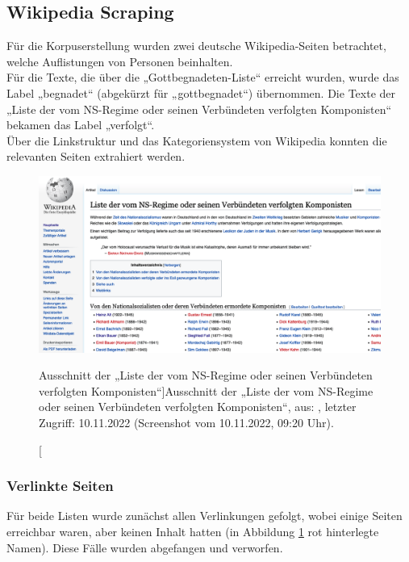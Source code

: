 \documentclass[ngerman]{ttlab-qualify}
\begin{document}
\subsection{Wikipedia Scraping} \label{Wiki_scraping}
Für die Korpuserstellung wurden zwei deutsche Wikipedia-Seiten betrachtet, welche Auflistungen von Personen beinhalten. \\
Für die Texte, die über die „Gottbegnadeten-Liste“ \parencite{wiki:begnadet} erreicht wurden, wurde das Label „begnadet“ (abgekürzt für „gottbegnadet“) übernommen. Die Texte der „Liste der vom NS-Regime oder seinen Verbündeten verfolgten Komponisten“ \parencite{wiki:verfolgt} bekamen das Label „verfolgt“.\\
Über die Linkstruktur und das Kategoriensystem von Wikipedia konnten die relevanten Seiten extrahiert werden.
\begin{figure}[H]
\begin{center}
\includegraphics[width=15cm]{grafiken/Wiki_Liste_verfolgt.png}
\caption[Ausschnitt der „Liste der vom NS-Regime oder seinen Verbündeten verfolgten Komponisten“]{Ausschnitt der „Liste der vom NS-Regime oder seinen Verbündeten verfolgten Komponisten“, aus: \textcite{wiki:verfolgt}, letzter Zugriff: 10.11.2022 (Screenshot vom 10.11.2022, 09:20 Uhr)}.
\label{Wikiliste_verfolgt}
\end{center}
\end{figure} 
\subsubsection{Verlinkte Seiten}
Für beide Listen wurde zunächst allen Verlinkungen gefolgt, wobei einige Seiten erreichbar waren, aber keinen Inhalt hatten (in Abbildung \ref{Wikiliste_verfolgt} rot hinterlegte Namen). Diese Fälle wurden abgefangen und verworfen.
\end{document}
